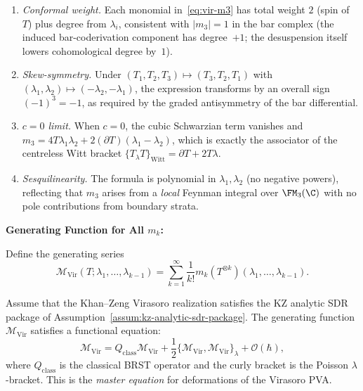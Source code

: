 \begin{remark}
\leavevmode
\begin{enumerate}
\item \emph{Conformal weight.} Each monomial in~\eqref{eq:vir-m3}
 has total weight $2$ (spin of~$T$) plus degree from
 $\lambda_i$, consistent with $|m_3| = 1$ in the bar complex
 (the induced bar-coderivation component has degree~$+1$; the
 desuspension itself lowers cohomological degree by~$1$).
\item \emph{Skew-symmetry.} Under $(T_1,T_2,T_3) \mapsto
 (T_3,T_2,T_1)$ with $(\lambda_1,\lambda_2) \mapsto
 (-\lambda_2,-\lambda_1)$, the expression transforms by an
 overall sign $(-1)^3 = -1$, as required by the graded
 antisymmetry of the bar differential.
\item \emph{$c = 0$ limit.} When $c = 0$, the cubic Schwarzian
 term vanishes and $m_3 = 4T\lambda_1\lambda_2 +
 2(\partial T)(\lambda_1 - \lambda_2)$, which is exactly the
 associator of the centreless Witt bracket
 $\{T_\lambda T\}_{\text{Witt}} = \partial T + 2T\lambda$.
\item \emph{Sesquilinearity.} The formula is polynomial
 in $\lambda_1, \lambda_2$ (no negative powers), reflecting
 that $m_3$ arises from a \emph{local} Feynman integral over
 $\FM_3(\C)$ with no pole contributions from boundary strata.
\end{enumerate}
\end{remark}

\textbf{Generating Function for All $m_k$:}

Define the generating series
\begin{equation}
\mathcal{M}_{\text{Vir}}(T; \lambda_1, \ldots, \lambda_{k-1}) = \sum_{k=1}^\infty \frac{1}{k!} m_k(T^{\otimes k})(\lambda_1, \ldots, \lambda_{k-1}).
\end{equation}

\begin{theorem}
Assume that the Khan--Zeng Virasoro realization satisfies the KZ
analytic SDR package of
Assumption~\textup{\ref{assum:kz-analytic-sdr-package}}.
The generating function $\mathcal{M}_{\text{Vir}}$ satisfies a functional equation:
\begin{equation}
\mathcal{M}_{\text{Vir}} = Q_{\text{class}} \mathcal{M}_{\text{Vir}} + \frac{1}{2} \{\mathcal{M}_{\text{Vir}}, \mathcal{M}_{\text{Vir}}\}_\lambda + \mathcal{O}(\hbar),
\end{equation}
where $Q_{\text{class}}$ is the classical BRST operator and the curly bracket is the Poisson $\lambda$-bracket. This is the \emph{master equation} for deformations of the Virasoro PVA.
\end{theorem}


